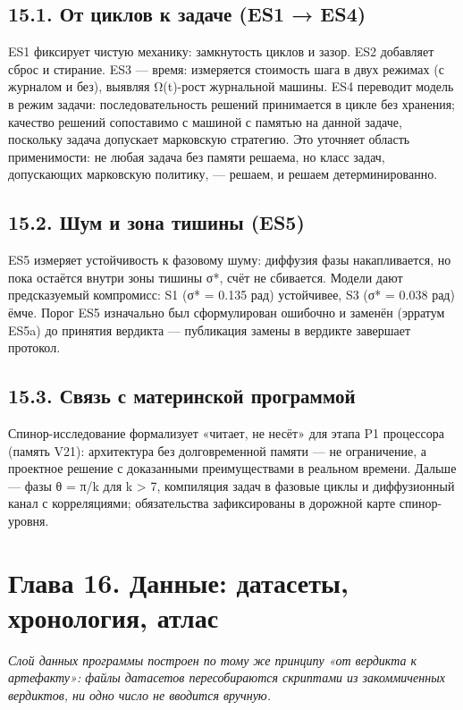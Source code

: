 \documentclass[11pt,a4paper]{article}
\begin{document}
\subsection{15.1. От циклов к задаче (ES1 → ES4)}

ES1 фиксирует чистую механику: замкнутость циклов и зазор. ES2 добавляет сброс и стирание. ES3 — время: измеряется стоимость шага в двух режимах (с журналом и без), выявляя Ω(t)-рост журнальной машины. ES4 переводит модель в режим задачи: последовательность решений принимается в цикле без хранения; качество решений сопоставимо с машиной с памятью на данной задаче, поскольку задача допускает марковскую стратегию. Это уточняет область применимости: не любая задача без памяти решаема, но класс задач, допускающих марковскую политику, — решаем, и решаем детерминированно.

\subsection{15.2. Шум и зона тишины (ES5)}

ES5 измеряет устойчивость к фазовому шуму: диффузия фазы накапливается, но пока остаётся внутри зоны тишины σ*, счёт не сбивается. Модели дают предсказуемый компромисс: S1 (σ* = 0.135 рад) устойчивее, S3 (σ* = 0.038 рад) ёмче. Порог ES5 изначально был сформулирован ошибочно и заменён (эрратум ES5a) до принятия вердикта — публикация замены в вердикте завершает протокол.

\subsection{15.3. Связь с материнской программой}

Спинор-исследование формализует «читает, не несёт» для этапа P1 процессора (память V21): архитектура без долговременной памяти — не ограничение, а проектное решение с доказанными преимуществами в реальном времени. Дальше — фазы θ = π/k для k > 7, компиляция задач в фазовые циклы и диффузионный канал с корреляциями; обязательства зафиксированы в дорожной карте спинор-уровня.

\section{Глава 16. Данные: датасеты, хронология, атлас}

\noindent\textit{\color{copper}Слой данных программы построен по тому же принципу «от вердикта к артефакту»: файлы датасетов пересобираются скриптами из закоммиченных вердиктов, ни одно число не вводится вручную.}
\end{document}
